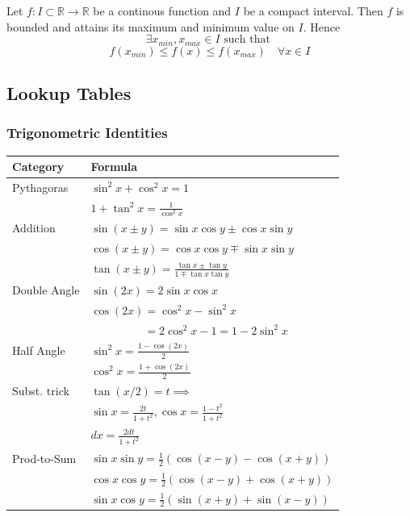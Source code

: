 \begin{theorem}
    Let $f: I \subset \mathbb{R} \to \mathbb{R}$ be a continous function and $I$ be a compact interval. Then $f$ is bounded and attains its maximum and minimum value on $I$. Hence
    $$\exists x_{min}, x_{max} \in I \text{ such that }$$
    $$ f(x_{min}) \leq f(x) \leq f(x_{max}) \quad \forall x \in I$$
\end{theorem}


\subsection{Lookup Tables}

\subsubsection{Trigonometric Identities}
\begin{center}
\scriptsize
\setlength{\tabcolsep}{2.5pt}
\begin{tabular}{|l|l|}
\hline
\textbf{Category} & \textbf{Formula} \\ \hline
Pythagoras & $\sin^2 x + \cos^2 x = 1$ \\
& $1 + \tan^2 x = \frac{1}{\cos^2 x}$ \\ \hline
Addition & $\sin(x \pm y) = \sin x \cos y \pm \cos x \sin y$ \\
& $\cos(x \pm y) = \cos x \cos y \mp \sin x \sin y$ \\
& $\tan(x \pm y) = \frac{\tan x \pm \tan y}{1 \mp \tan x \tan y}$ \\ \hline
Double Angle & $\sin(2x) = 2 \sin x \cos x$ \\
& $\cos(2x) = \cos^2 x - \sin^2 x$ \\
& $\phantom{\cos(2x)} = 2 \cos^2 x - 1 = 1 - 2 \sin^2 x$ \\ \hline
Half Angle & $\sin^2 x = \frac{1 - \cos(2x)}{2}$ \\
& $\cos^2 x = \frac{1 + \cos(2x)}{2}$ \\ \hline
Subst. trick & $\tan(x/2) = t \implies$ \\
& $\sin x = \frac{2t}{1+t^2}, \cos x = \frac{1-t^2}{1+t^2}$ \\
& $dx = \frac{2dt}{1+t^2}$ \\ \hline
Prod-to-Sum & $\sin x \sin y = \frac{1}{2}(\cos(x-y) - \cos(x+y))$ \\
& $\cos x \cos y = \frac{1}{2}(\cos(x-y) + \cos(x+y))$ \\
& $\sin x \cos y = \frac{1}{2}(\sin(x+y) + \sin(x-y))$ \\ \hline
\end{tabular}
\end{center}

